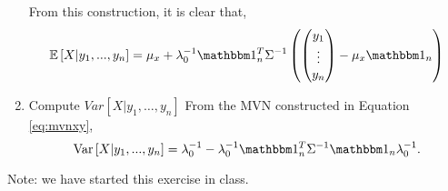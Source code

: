 \documentclass{article}[12pt]
\begin{document}
\begin{enumerate}
From this construction, it is clear that,
\begin{equation}
	\mathbb E \left[ X | y_1,...,y_n \right] = \mu_x + \lambda_0^{-1} \mathbbm 1_n^T \Sigma^{-1} \left(
		\begin{pmatrix}
			y_1 \\
			\vdots \\
			y_n \\
		\end{pmatrix}
	- \mu_x \mathbbm 1_n\right)
\end{equation}

\item Compute $Var[X|y_1,\ldots,y_n]$
	From the MVN constructed in Equation \ref{eq:mvnxy}, 
	\begin{equation}
		\operatorname{Var} \left[ X | y_1,...,y_n \right] = \lambda_0^{-1} - \lambda_0^{-1} \mathbbm 1_n^T \Sigma^{-1} \mathbbm 1_n \lambda_0^{-1}.
	\end{equation}
	
\end{enumerate}
Note: we have started this exercise in class.
\end{document}

